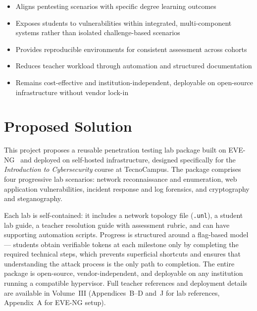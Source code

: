\begin{itemize}
    \item Aligns pentesting scenarios with specific degree learning outcomes
    \item Exposes students to vulnerabilities within integrated, multi-component systems
          rather than isolated challenge-based scenarios
    \item Provides reproducible environments for consistent assessment across cohorts
    \item Reduces teacher workload through automation and structured documentation
    \item Remains cost-effective and institution-independent, deployable on open-source
          infrastructure without vendor lock-in
\end{itemize}

\section{Proposed Solution}

This project proposes a reusable penetration testing lab package built on
EVE-NG~\cite{eve_ng} and deployed on self-hosted infrastructure, designed
specifically for the \textit{Introduction to Cybersecurity} course at TecnoCampus.
The package comprises four progressive lab scenarios: network reconnaissance and
enumeration, web application vulnerabilities, incident response and log forensics,
and cryptography and steganography.

Each lab is self-contained: it includes a network topology file (\texttt{.unl}),
a student lab guide, a teacher resolution guide with assessment rubric, and
can have supporting automation scripts. Progress is structured around a flag-based model ---
students obtain verifiable tokens at each milestone only by completing the required
technical steps, which prevents superficial shortcuts and ensures that understanding
the attack process is the only path to completion. The entire package is open-source,
vendor-independent, and deployable on any institution running a compatible hypervisor.
Full teacher references and deployment details are available in Volume~III
(Appendices~B--D and~J for lab references, Appendix~A for EVE-NG setup).


